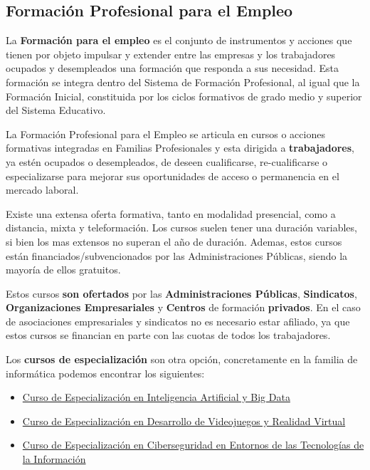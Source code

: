 \subsection{Formación Profesional para el Empleo}
La \textbf{Formación para el empleo} es el conjunto de instrumentos y acciones que tienen por objeto impulsar y extender entre las empresas y los trabajadores ocupados y desempleados una formación que responda a sus necesidad. Esta formación se integra dentro del Sistema de Formación Profesional, al igual que la Formación Inicial, constituida por los ciclos formativos de grado medio y superior del Sistema Educativo.

La Formación Profesional para el Empleo se articula en cursos o acciones formativas integradas en Familias Profesionales y esta dirigida a \textbf{trabajadores}, ya estén ocupados o desempleados, de deseen cualificarse, re-cualificarse o especializarse para mejorar sus oportunidades de acceso o permanencia en el mercado laboral.

Existe una extensa oferta formativa, tanto en modalidad presencial, como a distancia, mixta y teleformación. Los cursos suelen tener una duración variables, si bien los mas extensos no superan el año de duración. Ademas, estos cursos están financiados/subvencionados por las Administraciones Públicas, siendo la mayoría de ellos gratuitos.

Estos cursos \textbf{son ofertados} por las \textbf{Administraciones Públicas}, \textbf{Sindicatos}, \textbf{Organizaciones Empresariales} y \textbf{Centros} de formación \textbf{privados}. En el caso de asociaciones empresariales y sindicatos no es necesario estar afiliado, ya que estos cursos se financian en parte con las cuotas de todos los trabajadores.

Los \textbf{cursos de especialización} son otra opción, concretamente en la familia de informática podemos encontrar los siguientes:

\begin{itemize}
    \item \href{https://www.todofp.es/que-estudiar/loe/informatica-comunicaciones/ce-inteligencia-artificial-bigdata.html}{Curso de Especialización en Inteligencia Artificial y Big Data}
    \item \href{https://www.todofp.es/que-estudiar/loe/informatica-comunicaciones/ce-desarrollo-videojuegos-realidad-virtual.html}{Curso de Especialización en Desarrollo de Videojuegos y Realidad Virtual}
    \item \href{https://www.todofp.es/que-estudiar/loe/informatica-comunicaciones/ciberseguridad-entornos-tecnologias-informacion.html}{Curso de Especialización en Ciberseguridad en Entornos de las Tecnologías de la Información}
\end{itemize}


